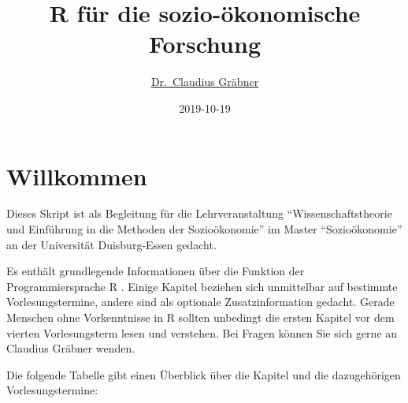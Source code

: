 \documentclass[]{tufte-book}
\title{R für die sozio-ökonomische Forschung}
\author{\href{http://claudius-graebner.com/}{Dr.~Claudius Gräbner}}
\date{2019-10-19}
\begin{document}
\maketitle



{
\setcounter{tocdepth}{1}
\tableofcontents
}

\chapter*{Willkommen}\label{willkommen}

Dieses Skript ist als Begleitung für die Lehrveranstaltung
``Wissenschaftstheorie und Einführung in die Methoden der
Sozioökonomie'' im Master ``Sozioökonomie'' an der Universität
Duisburg-Essen gedacht.

Es enthält grundlegende Informationen über die Funktion der
Programmiersprache R \citep{R-Team}. Einige Kapitel beziehen sich
unmittelbar auf bestimmte Vorlesungstermine, andere sind als optionale
Zusatzinformation gedacht. Gerade Menschen ohne Vorkenntnisse in R
sollten unbedingt die ersten Kapitel vor dem vierten Vorlesungsterm
lesen und verstehen. Bei Fragen können Sie sich gerne an Claudius
Gräbner wenden.

Die folgende Tabelle gibt einen Überblick über die Kapitel und die
dazugehörigen Vorlesungstermine:
\end{document}
